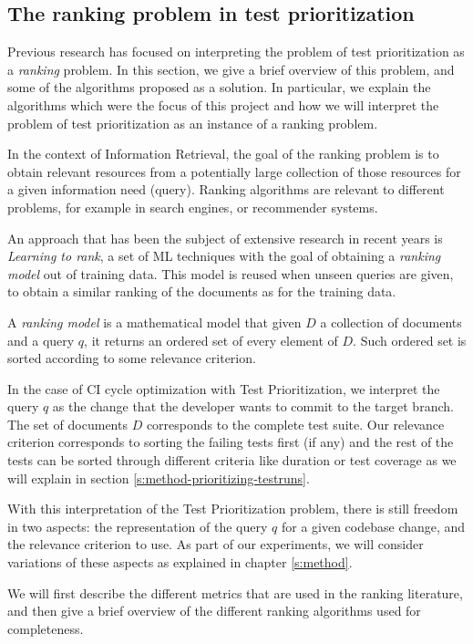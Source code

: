 \subsection{The ranking problem in test prioritization}

Previous research has focused on interpreting the problem of test prioritization as a \emph{ranking} 
problem. In this section, we give a brief overview of this problem, and some of the algorithms proposed
as a solution. In particular, we explain the algorithms which were the focus of this project
and how we will interpret the problem of test prioritization as an instance of a ranking problem.

In the context of Information Retrieval, the goal of the ranking problem is to obtain relevant resources
from a potentially large collection of those resources for a given information need (query). 
Ranking algorithms are relevant to different problems, for example in search engines, or 
recommender systems.

An approach that has been the subject of extensive research in recent years is \emph{Learning to rank},
a set of ML techniques with the goal of obtaining a \emph{ranking model} out of
training data. This model is reused when unseen queries are given,
to obtain a similar ranking of the documents as for the training data. 

A \emph{ranking model} is a mathematical model that given $D$ a collection of documents
and a query $q$, it returns an ordered set of every element of $D$. Such ordered set is
sorted according to some relevance criterion.

In the case of CI cycle optimization with Test Prioritization, we interpret the query $q$ as the
change that the developer wants to commit to the target branch. The set of documents $D$ corresponds to
the complete test suite. Our relevance criterion corresponds to sorting the
failing tests first (if any) and the rest of the tests can be sorted through different criteria
like duration or test coverage as we will explain in section \ref{s:method-prioritizing-testruns}.

With this interpretation of the Test Prioritization problem, there is still freedom 
in two aspects: the representation of the query $q$ for a given codebase change, and the 
relevance criterion to use. As part of our experiments, we will consider variations
of these aspects as explained in chapter \ref{s:method}.

We will first describe the different metrics that are used in the ranking literature, and then
give a brief overview of the different ranking algorithms used for completeness.


